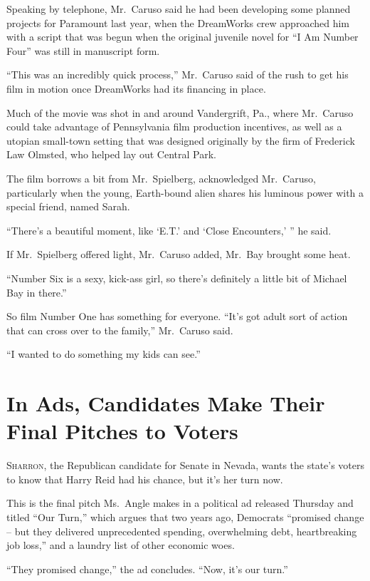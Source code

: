 ﻿\documentclass[12pt]{article}
\begin{document}
Speaking by telephone, Mr.~Caruso said he had been developing some planned projects for Paramount
last year, when the DreamWorks crew approached him with a script that was begun when the original
juvenile novel for ``I Am Number Four'' was still in manuscript form.

``This was an incredibly quick process,'' Mr.~Caruso said of the rush to get his film in motion once
DreamWorks had its financing in place.

Much of the movie was shot in and around Vandergrift, Pa., where Mr.~Caruso could take advantage of
Pennsylvania film production incentives, as well as a utopian small-town setting that was designed
originally by the firm of Frederick Law Olmsted, who helped lay out Central Park.

The film borrows a bit from Mr.~Spielberg, acknowledged Mr.~Caruso, particularly when the young,
Earth-bound alien shares his luminous power with a special friend, named Sarah.

``There's a beautiful moment, like `E.T.' and `Close Encounters,' '' he said.

If Mr.~Spielberg offered light, Mr.~Caruso added, Mr.~Bay brought some heat.

``Number Six is a sexy, kick-ass girl, so there's definitely a little bit of Michael Bay in there.''

So film Number One has something for everyone. ``It's got adult sort of action that can cross over
to the family,'' Mr.~Caruso said.

``I wanted to do something my kids can see.''

\section{In Ads, Candidates Make Their Final Pitches to Voters}

\lettrine{S}{harron}, the Republican candidate for Senate in Nevada, wants
the state's voters to know that Harry Reid had his chance, but it's her turn now.

This is the final pitch Ms.~Angle makes in a political ad released Thursday and titled ``Our Turn,''
which argues that two years ago, Democrats ``promised change -- but they delivered unprecedented
spending, overwhelming debt, heartbreaking job loss,'' and a laundry list of other economic woes.

``They promised change,'' the ad concludes. ``Now, it's our turn.''
\end{document}
